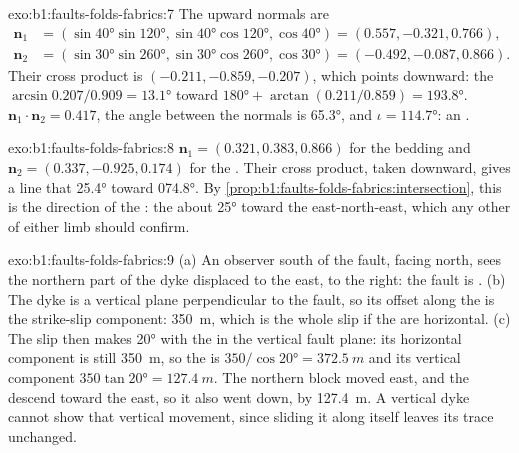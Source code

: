 \begin{solution}{exo:b1:faults-folds-fabrics:7}
The upward normals are
\begin{align*}
  \mathbf n_1 &= (\sin\ang{40}\sin\ang{120}, \sin\ang{40}\cos\ang{120}, \cos\ang{40}) = (0.557, -0.321, 0.766),\\
  \mathbf n_2 &= (\sin\ang{30}\sin\ang{260}, \sin\ang{30}\cos\ang{260}, \cos\ang{30}) = (-0.492, -0.087, 0.866).
\end{align*}
Their cross product is
$(-0.211, -0.859, -0.207)$, which points downward: the  
$\arcsin 0.207/0.909 = \ang{13.1}$ toward $\ang{180} + \arctan(0.211/0.859) =
\ang{193.8}$. $\mathbf n_1\cdot\mathbf n_2 = 0.417$, the angle between the
normals is \ang{65.3}, and $\iota = \ang{114.7}$: an .
\end{solution}

\begin{solution}{exo:b1:faults-folds-fabrics:8}
$\mathbf n_1 = (0.321, 0.383, 0.866)$ for the bedding and
$\mathbf n_2 = (0.337, -0.925, 0.174)$ for the . Their cross product,
taken downward, gives a line that  \ang{25.4} toward \ang{074.8}. By
\cref{prop:b1:faults-folds-fabrics:intersection}, this is the direction of the
: the   about \ang{25} toward the east-north-east, which
any other  of either limb should confirm.
\end{solution}

\begin{solution}{exo:b1:faults-folds-fabrics:9}
(a) An observer south of the fault, facing north, sees the northern part of the
dyke displaced to the east, to the right: the fault is . (b) The dyke is
a vertical plane perpendicular to the fault, so its offset along the  is
the strike-slip component: \qty{350}{m}, which is the whole slip if the
 are horizontal. (c) The slip then makes \ang{20} with the 
in the vertical fault plane: its horizontal component is still \qty{350}{m},
so the  is $350/\cos\ang{20} = \qty{372.5}{m}$ and its vertical
component $350\tan\ang{20} = \qty{127.4}{m}$. The northern block moved east,
and the  descend toward the east, so it also went down, by
\qty{127.4}{m}. A vertical dyke cannot show that vertical movement, since
sliding it along itself leaves its trace unchanged.
\end{solution}

